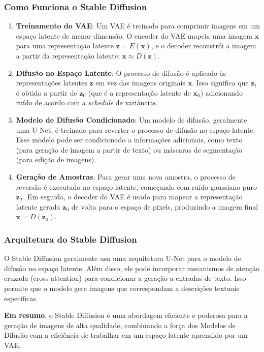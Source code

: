 \documentclass{article}
\begin{document}
\subsubsection{Como Funciona o Stable Diffusion}

\begin{enumerate}
    \item \textbf{Treinamento do VAE}: Um VAE é treinado para comprimir imagens em um espaço latente de menor dimensão. O encoder do VAE mapeia uma imagem $\mathbf{x}$ para uma representação latente $\mathbf{z} = E(\mathbf{x})$, e o decoder reconstrói a imagem a partir da representação latente: $\mathbf{x} \approx D(\mathbf{z})$.
    \item \textbf{Difusão no Espaço Latente}: O processo de difusão é aplicado às representações latentes $\mathbf{z}$ em vez das imagens originais $\mathbf{x}$. Isso significa que $\mathbf{z}_t$ é obtido a partir de $\mathbf{z}_0$ (que é a representação latente de $\mathbf{x}_0$) adicionando ruído de acordo com a \textit{schedule} de variâncias.
    \item \textbf{Modelo de Difusão Condicionado}: Um modelo de difusão, geralmente uma U-Net, é treinado para reverter o processo de difusão no espaço latente. Esse modelo pode ser condicionado a informações adicionais, como texto (para geração de imagem a partir de texto) ou máscaras de segmentação (para edição de imagens).
    \item \textbf{Geração de Amostras}: Para gerar uma nova amostra, o processo de reversão é executado no espaço latente, começando com ruído gaussiano puro $\mathbf{z}_T$. Em seguida, o decoder do VAE é usado para mapear a representação latente gerada $\mathbf{z}_0$ de volta para o espaço de pixels, produzindo a imagem final $\mathbf{x} = D(\mathbf{z}_0)$.
\end{enumerate}

\subsubsection{Arquitetura do Stable Diffusion}

O Stable Diffusion geralmente usa uma arquitetura U-Net para o modelo de difusão no espaço latente. Além disso, ele pode incorporar mecanismos de atenção cruzada (cross-attention) para condicionar a geração a entradas de texto. Isso permite que o modelo gere imagens que correspondam a descrições textuais específicas.

\textbf{Em resumo}, o Stable Diffusion é uma abordagem eficiente e poderosa para a geração de imagens de alta qualidade, combinando a força dos Modelos de Difusão com a eficiência de trabalhar em um espaço latente aprendido por um VAE.
\end{document}
